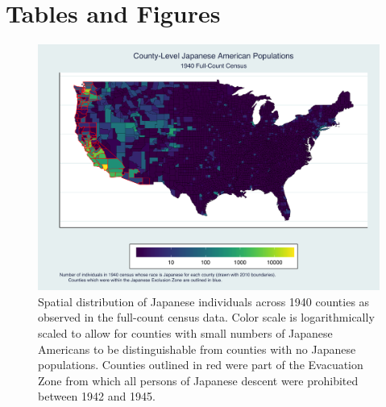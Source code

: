 \documentclass[12pt]{article}
\begin{document}

\newpage



\section*{Tables and Figures}







\begin{figure}
    \centering
    \includegraphics[width=1.0\textwidth]{figures/county_JAmap.png}
    \caption{Spatial distribution of Japanese individuals across 1940 counties as observed in the full-count census data. Color scale is logarithmically scaled to allow for counties with small numbers of Japanese Americans to be distinguishable from counties with no Japanese populations. Counties outlined in red were part of the Evacuation Zone from which all persons of Japanese descent were prohibited between 1942 and 1945.}
    \label{fig:1940JAmap}
\end{figure}
\end{document}
